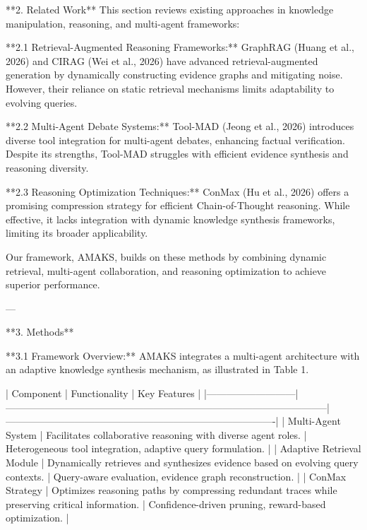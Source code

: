 **2. Related Work**  
This section reviews existing approaches in knowledge manipulation, reasoning, and multi-agent frameworks:  

**2.1 Retrieval-Augmented Reasoning Frameworks:**  
GraphRAG (Huang et al., 2026) and CIRAG (Wei et al., 2026) have advanced retrieval-augmented generation by dynamically constructing evidence graphs and mitigating noise. However, their reliance on static retrieval mechanisms limits adaptability to evolving queries.  

**2.2 Multi-Agent Debate Systems:**  
Tool-MAD (Jeong et al., 2026) introduces diverse tool integration for multi-agent debates, enhancing factual verification. Despite its strengths, Tool-MAD struggles with efficient evidence synthesis and reasoning diversity.  

**2.3 Reasoning Optimization Techniques:**  
ConMax (Hu et al., 2026) offers a promising compression strategy for efficient Chain-of-Thought reasoning. While effective, it lacks integration with dynamic knowledge synthesis frameworks, limiting its broader applicability.  

Our framework, AMAKS, builds on these methods by combining dynamic retrieval, multi-agent collaboration, and reasoning optimization to achieve superior performance.  

---

**3. Methods**  

**3.1 Framework Overview:**  
AMAKS integrates a multi-agent architecture with an adaptive knowledge synthesis mechanism, as illustrated in Table 1.  

| Component                 | Functionality                                                                                     | Key Features                                                                     |  
|---------------------------|--------------------------------------------------------------------------------------------------|----------------------------------------------------------------------------------|  
| Multi-Agent System        | Facilitates collaborative reasoning with diverse agent roles.                                    | Heterogeneous tool integration, adaptive query formulation.                      |  
| Adaptive Retrieval Module | Dynamically retrieves and synthesizes evidence based on evolving query contexts.                 | Query-aware evaluation, evidence graph reconstruction.                           |  
| ConMax Strategy           | Optimizes reasoning paths by compressing redundant traces while preserving critical information. | Confidence-driven pruning, reward-based optimization.                            |  

